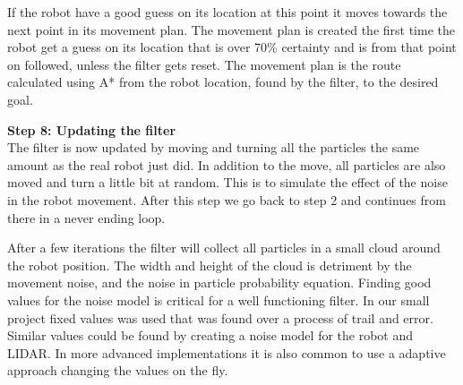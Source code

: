 If the robot have a good guess on its location at this point it moves towards the next point in its movement plan. The movement plan is created the first time the robot get a guess on its location that is over 70\% certainty and is from that point on followed, unless the filter gets reset. The movement plan is the route calculated using A* from the robot location, found by the filter, to the desired goal. 

\textbf{Step 8: Updating the filter}\\
The filter is now updated by moving and turning all the particles the same amount as the real robot just did. In addition to the move, all particles are also moved and turn a little bit at random. This is to simulate the effect of the noise in the robot movement. After this step we go back to step 2 and continues from there in a never ending loop. 

After a few iterations the filter will collect all particles in a small cloud around the robot position. The width and height of the cloud is detriment by the movement noise, and the noise in particle probability equation. Finding good values for the noise model is critical for a well functioning filter. In our small project fixed values was used that was found over a process of trail and error.  Similar values could be found by creating a noise model for the robot and LIDAR. In more advanced implementations it is also common to use a adaptive approach changing the values on the fly. 

 
